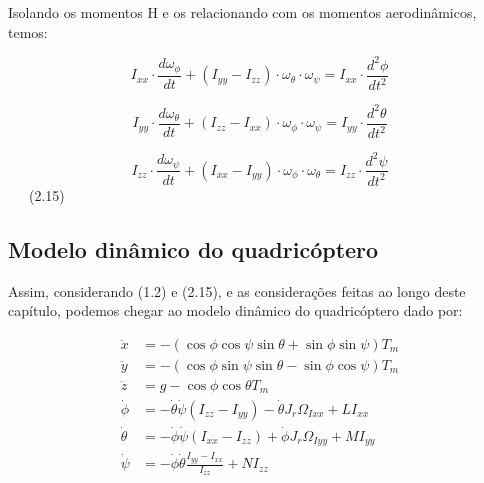 Isolando os momentos H e os relacionando com os momentos aerodinâmicos, temos:

\[
	I_{xx} \cdot \frac{d\omega_{\phi}}{dt} + (I_{yy} - I_{zz}) \cdot \omega_{\theta} \cdot \omega_{\psi} = I_{xx} \cdot \frac{d^2\phi}{dt^2}
\]

\[
	I_{yy} \cdot \frac{d\omega_{\theta}}{dt} + (I_{zz} - I_{xx}) \cdot \omega_{\phi} \cdot \omega_{\psi} = I_{yy} \cdot \frac{d^2\theta}{dt^2}
\]

\[
	I_{zz} \cdot \frac{d\omega_{\psi}}{dt} + (I_{xx} - I_{yy}) \cdot \omega_{\phi} \cdot \omega_{\theta} = I_{zz} \cdot \frac{d^2\psi}{dt^2}
\]
\ \ \ (2.15)

\subsection{Modelo dinâmico do quadricóptero}

Assim, considerando (1.2) e (2.15), e as considerações feitas ao longo deste capítulo, podemos chegar ao modelo dinâmico do quadricóptero dado por:

\begin{align*}
	\ddot{x}     & = -(\cos\phi \cos\psi \sin\theta + \sin\phi \sin\psi)T_m                            \\
	\ddot{y}     & = -(\cos\phi \sin\psi \sin\theta - \sin\phi \cos\psi)T_m                            \\
	\ddot{z}     & = g - \cos\phi \cos\theta T_m                                                       \\
	\dot{\phi}   & = -\dot{\theta}\dot{\psi}(I_{zz} - I_{yy}) - \dot{\theta}J_r\Omega_{Ixx} + L I_{xx} \\
	\dot{\theta} & = -\dot{\phi}\dot{\psi}(I_{xx} - I_{zz}) + \dot{\phi}J_r\Omega_{Iyy} + M I_{yy}     \\
	\dot{\psi}   & = -\dot{\phi}\dot{\theta}\frac{I_{yy} - I_{xx}}{I_{zz}} + N I_{zz}
\end{align*}




\printindex
